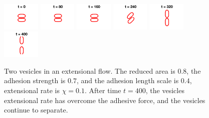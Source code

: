 \documentclass[aps,prl,twocolumn,showpacs,amsmath,amssymb]{revtex4-1}
\begin{document}
\begin{figure}[htp]
  \includegraphics[width = 0.16\textwidth]{figs/extensional_adR4em1adS7em1Chi1em1_ra080_image01.png}
  \includegraphics[width = 0.16\textwidth]{figs/extensional_adR4em1adS7em1Chi1em1_ra080_image02.png}
  \includegraphics[width = 0.16\textwidth]{figs/extensional_adR4em1adS7em1Chi1em1_ra080_image03.png}
  \includegraphics[width = 0.16\textwidth]{figs/extensional_adR4em1adS7em1Chi1em1_ra080_image04.png}
  \includegraphics[width = 0.16\textwidth]{figs/extensional_adR4em1adS7em1Chi1em1_ra080_image05.png}
  \includegraphics[width = 0.16\textwidth]{figs/extensional_adR4em1adS7em1Chi1em1_ra080_image06.png}
  \caption{Two vesicles in an extensional flow.  The reduced area is
  $0.8$, the adhesion strength is $0.7$, and the adhesion length scale
is $0.4$, extensional rate is $\chi = 0.1$.  After time $t=400$, the
  vesicles extensional rate has overcome the adhesive force, and the
  vesicles continue to separate.}
\end{figure}
\end{document}
